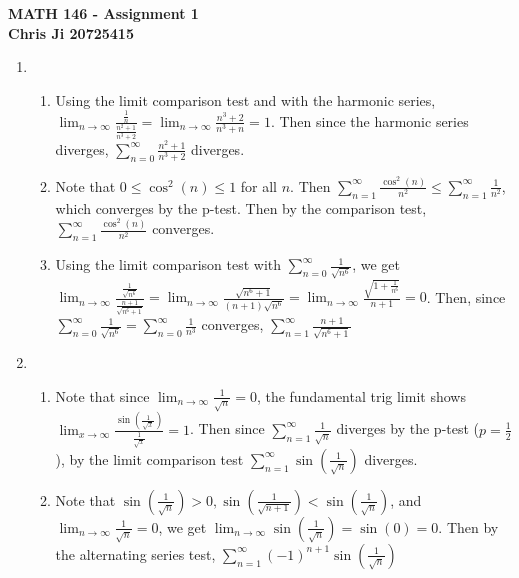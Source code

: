\documentclass[10pt,english]{article}
\begin{document}
\noindent \begin{center}
\textbf{\large{}MATH 146 - Assignment 1}\\
\textbf{\large{}Chris Ji 20725415}
\par\end{center}{\large \par}
\medskip{}

\begin{enumerate}
\item \begin{enumerate}
    \item Using the limit comparison test and with the harmonic series, $\lim_{n\rightarrow\infty}\frac{\frac{1}{n}}{\frac{n^2+1}{n^3+2}}=\lim_{n\rightarrow\infty}\frac{n^3+2}{n^3+n}=1$. Then since the harmonic series diverges, $\sum_{n=0}^\infty\frac{n^2+1}{n^3+2}$ diverges. 
    \item Note that $0\leq\cos^2(n)\leq1$ for all $n$. Then $\sum_{n=1}^\infty\frac{\cos^2(n)}{n^2}\leq\sum_{n=1}^\infty\frac{1}{n^2}$, which converges by the p-test. Then by the comparison test, $\sum_{n=1}^\infty\frac{\cos^2(n)}{n^2}$ converges. 
    \item Using the limit comparison test with $\sum_{n=0}^\infty\frac{1}{\sqrt{n^6}}$, we get $\lim_{n\rightarrow\infty}\frac{\frac{1}{\sqrt{n^6}}}{\frac{n+1}{\sqrt{n^6+1}}}=\lim_{n\rightarrow\infty}\frac{\sqrt{n^6+1}}{(n+1)\sqrt{n^6}}=\lim_{n\rightarrow\infty}\frac{\sqrt{1+\frac{1}{n^6}}}{n+1}=0$. Then, since $\sum_{n=0}^
    \infty\frac{1}{\sqrt{n^6}}=\sum_{n=0}^\infty\frac{1}{n^3}$ converges, $\sum_{n=1}^\infty\frac{n+1}{\sqrt{n^6+1}}$
\end{enumerate}



\item \begin{enumerate}
    \item Note that since $\lim_{n\rightarrow\infty}\frac{1}{\sqrt{n}}=0$, the fundamental trig limit shows $\lim_{x\rightarrow\infty}\frac{\sin\left(\frac{1}{\sqrt{x}}\right)}{\frac{1}{\sqrt{x}}}=1$. Then since $\sum_{n=1}^\infty\frac{1}{\sqrt{n}}$ diverges by the p-test ($p=\frac{1}{2}$), by the limit comparison test $\sum_{n=1}^\infty\sin\left(\frac{1}{\sqrt{n}}\right)$ diverges. 
    \item Note that $\sin\left(\frac{1}{\sqrt{n}}\right)>0,\sin\left(\frac{1}{\sqrt{n+1}}\right)<\sin\left(\frac{1}{\sqrt{n}}\right)$, and $\lim_{n\rightarrow\infty}\frac{1}{\sqrt{n}}=0$, we get $\lim_{n\rightarrow\infty}\sin\left(\frac{1}{\sqrt{n}}\right)=\sin(0)=0$. Then by the alternating series test, $\sum_{n=1}^\infty(-1)^{n+1}\sin(\frac{1}{\sqrt{n}})$
\end{enumerate}




\end{enumerate}
\end{document}
